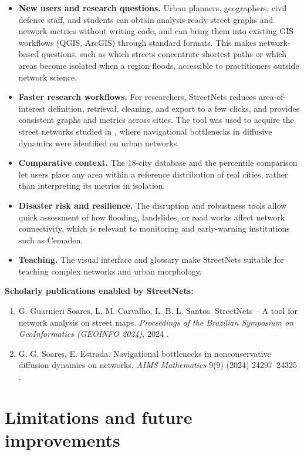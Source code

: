 \documentclass[11pt, letterpaper]{article}
\begin{document}
\begin{itemize}
    \item \textbf{New users and research questions.} Urban planners, geographers, civil defense staff, and students can obtain analysis-ready street graphs and network metrics without writing code, and can bring them into existing GIS workflows (QGIS, ArcGIS) through standard formats. This makes network-based questions, such as which streets concentrate shortest paths or which areas become isolated when a region floods, accessible to practitioners outside network science.
    \item \textbf{Faster research workflows.} For researchers, StreetNets reduces area-of-interest definition, retrieval, cleaning, and export to a few clicks, and provides consistent graphs and metrics across cities. The tool was used to acquire the street networks studied in \cite{soares2024}, where navigational bottlenecks in diffusive dynamics were identified on urban networks.
    \item \textbf{Comparative context.} The 18-city database and the percentile comparison let users place any area within a reference distribution of real cities, rather than interpreting its metrics in isolation.
    \item \textbf{Disaster risk and resilience.} The disruption and robustness tools allow quick assessment of how flooding, landslides, or road works affect network connectivity, which is relevant to monitoring and early-warning institutions such as Cemaden.
    \item \textbf{Teaching.} The visual interface and glossary make StreetNets suitable for teaching complex networks and urban morphology.
\end{itemize}

\noindent
\textbf{Scholarly publications enabled by StreetNets:}
\begin{enumerate}[noitemsep]
    \item G. Guarnieri Soares, L. M. Carvalho, L. B. L. Santos. StreetNets -- A tool for network analysis on street maps. \textit{Proceedings of the Brazilian Symposium on GeoInformatics (GEOINFO 2024)}, 2024 \cite{streetnets_geoinfo2024}.
    \item G. G. Soares, E. Estrada. Navigational bottlenecks in nonconservative diffusion dynamics on networks. \textit{AIMS Mathematics} 9(9) (2024) 24297--24325 \cite{soares2024}.
\end{enumerate}

\section{Limitations and future improvements}
\end{document}
